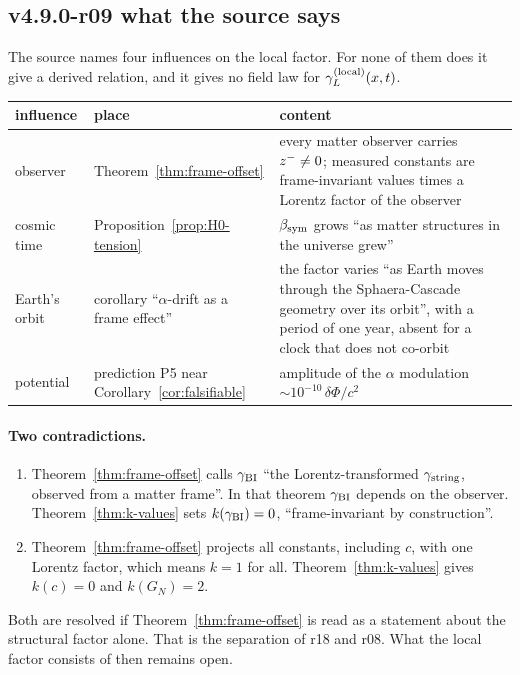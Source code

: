 \subsection*{v4.9.0-r09 what the source says}
\label{subsec:v490-r09-source}

The source names four influences on the local factor.  For none of them does it give a derived relation, and it gives
no field law for \(\gamma_L^{(\mathrm{local})}(x,t)\).
\begin{center}
\small
\begin{tabular}{@{}>{\raggedright\arraybackslash}p{}>{\raggedright\arraybackslash}p{}>{\raggedright\arraybackslash}p{}@{}}
\toprule
influence & place & content\\
\midrule
observer & Theorem~\ref{thm:frame-offset} & every matter observer carries \(z^-\neq0\); measured constants are frame-invariant values times a Lorentz factor of the observer\\
cosmic time & Proposition~\ref{prop:H0-tension} & \(\beta_{\mathrm{sym}}\) grows ``as matter structures in the universe grew''\\
Earth's orbit & corollary ``\(\alpha\)-drift as a frame effect'' & the factor varies ``as Earth moves through the Sphaera-Cascade geometry over its orbit'', with a period of one year, absent for a clock that does not co-orbit\\
potential & prediction P5 near Corollary~\ref{cor:falsifiable} & amplitude of the \(\alpha\) modulation \(\sim10^{-10}\,\delta\Phi/c^2\)\\
\bottomrule
\end{tabular}
\end{center}

\paragraph{Two contradictions.}
\begin{enumerate}[leftmargin=2em]
\item Theorem~\ref{thm:frame-offset} calls \(\gamma_{\mathrm{BI}}\) ``the Lorentz-transformed \(\gamma_{\mathrm{string}}\), observed from a matter frame''.
In that theorem \(\gamma_{\mathrm{BI}}\) depends on the observer.  Theorem~\ref{thm:k-values} sets \(k(\gamma_{\mathrm{BI}})=0\), ``frame-invariant by
construction''.
\item Theorem~\ref{thm:frame-offset} projects all constants, including \(c\), with one Lorentz factor, which means
\(k=1\) for all.  Theorem~\ref{thm:k-values} gives \(k(c)=0\) and \(k(G_N)=2\).
\end{enumerate}
Both are resolved if Theorem~\ref{thm:frame-offset} is read as a statement about the structural factor alone.  That is the
separation of r18 and r08.  What the local factor consists of then remains open.

